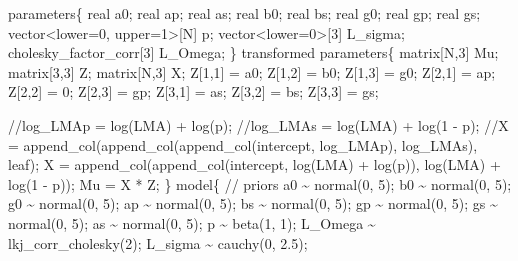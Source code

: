 \documentclass[
  12pt,
  letterpaper,
  DIV=11,
  numbers=noendperiod]{scrartcl}
\newenvironment{Shaded}{\begin{snugshade}}{\end{snugshade}}
\newcommand{\CommentTok}[1]{\textcolor[rgb]{0.37,0.37,0.37}{#1}}
\newcommand{\DataTypeTok}[1]{\textcolor[rgb]{0.68,0.00,0.00}{#1}}
\newcommand{\DecValTok}[1]{\textcolor[rgb]{0.68,0.00,0.00}{#1}}
\newcommand{\FloatTok}[1]{\textcolor[rgb]{0.68,0.00,0.00}{#1}}
\newcommand{\KeywordTok}[1]{\textcolor[rgb]{0.00,0.23,0.31}{#1}}
\newcommand{\NormalTok}[1]{\textcolor[rgb]{0.00,0.23,0.31}{#1}}
\begin{document}
\begin{Shaded}
\begin{Highlighting}[]
\KeywordTok{parameters}\NormalTok{\{}
  \DataTypeTok{real}\NormalTok{ a0;}
  \DataTypeTok{real}\NormalTok{ ap;}
  \DataTypeTok{real}\NormalTok{ as;}
  \DataTypeTok{real}\NormalTok{ b0;}
  \DataTypeTok{real}\NormalTok{ bs;}
  \DataTypeTok{real}\NormalTok{ g0;}
  \DataTypeTok{real}\NormalTok{ gp;}
  \DataTypeTok{real}\NormalTok{ gs;}
  \DataTypeTok{vector}\NormalTok{\textless{}}\KeywordTok{lower}\NormalTok{=}\DecValTok{0}\NormalTok{, }\KeywordTok{upper}\NormalTok{=}\DecValTok{1}\NormalTok{\textgreater{}[N] p;}
  \DataTypeTok{vector}\NormalTok{\textless{}}\KeywordTok{lower}\NormalTok{=}\DecValTok{0}\NormalTok{\textgreater{}[}\DecValTok{3}\NormalTok{] L\_sigma;}
  \DataTypeTok{cholesky\_factor\_corr}\NormalTok{[}\DecValTok{3}\NormalTok{] L\_Omega;}
\NormalTok{\}}
\KeywordTok{transformed parameters}\NormalTok{\{}
  \DataTypeTok{matrix}\NormalTok{[N,}\DecValTok{3}\NormalTok{] Mu;}
  \DataTypeTok{matrix}\NormalTok{[}\DecValTok{3}\NormalTok{,}\DecValTok{3}\NormalTok{] Z;}
  \DataTypeTok{matrix}\NormalTok{[N,}\DecValTok{3}\NormalTok{] X;}
\NormalTok{  Z[}\DecValTok{1}\NormalTok{,}\DecValTok{1}\NormalTok{] = a0;}
\NormalTok{  Z[}\DecValTok{1}\NormalTok{,}\DecValTok{2}\NormalTok{] = b0;}
\NormalTok{  Z[}\DecValTok{1}\NormalTok{,}\DecValTok{3}\NormalTok{] = g0;}
\NormalTok{  Z[}\DecValTok{2}\NormalTok{,}\DecValTok{1}\NormalTok{] = ap;}
\NormalTok{  Z[}\DecValTok{2}\NormalTok{,}\DecValTok{2}\NormalTok{] = }\DecValTok{0}\NormalTok{;}
\NormalTok{  Z[}\DecValTok{2}\NormalTok{,}\DecValTok{3}\NormalTok{] = gp;}
\NormalTok{  Z[}\DecValTok{3}\NormalTok{,}\DecValTok{1}\NormalTok{] = as;}
\NormalTok{  Z[}\DecValTok{3}\NormalTok{,}\DecValTok{2}\NormalTok{] = bs;}
\NormalTok{  Z[}\DecValTok{3}\NormalTok{,}\DecValTok{3}\NormalTok{] = gs;}

  \CommentTok{//log\_LMAp = log(LMA) + log(p);}
  \CommentTok{//log\_LMAs = log(LMA) + log(1 {-} p);}
  \CommentTok{//X = append\_col(append\_col(append\_col(intercept, log\_LMAp), log\_LMAs), leaf);}
\NormalTok{  X = append\_col(append\_col(intercept, log(LMA) + log(p)), log(LMA) + log(}\DecValTok{1}\NormalTok{ {-} p));}
\NormalTok{  Mu = X * Z;}
\NormalTok{\}}
\KeywordTok{model}\NormalTok{\{}
  \CommentTok{// priors}
\NormalTok{  a0 \textasciitilde{} normal(}\DecValTok{0}\NormalTok{, }\DecValTok{5}\NormalTok{);}
\NormalTok{  b0 \textasciitilde{} normal(}\DecValTok{0}\NormalTok{, }\DecValTok{5}\NormalTok{);}
\NormalTok{  g0 \textasciitilde{} normal(}\DecValTok{0}\NormalTok{, }\DecValTok{5}\NormalTok{);}
\NormalTok{  ap \textasciitilde{} normal(}\DecValTok{0}\NormalTok{, }\DecValTok{5}\NormalTok{);}
\NormalTok{  bs \textasciitilde{} normal(}\DecValTok{0}\NormalTok{, }\DecValTok{5}\NormalTok{);}
\NormalTok{  gp \textasciitilde{} normal(}\DecValTok{0}\NormalTok{, }\DecValTok{5}\NormalTok{);}
\NormalTok{  gs \textasciitilde{} normal(}\DecValTok{0}\NormalTok{, }\DecValTok{5}\NormalTok{);}
\NormalTok{  as \textasciitilde{} normal(}\DecValTok{0}\NormalTok{, }\DecValTok{5}\NormalTok{);}
\NormalTok{  p \textasciitilde{} beta(}\DecValTok{1}\NormalTok{, }\DecValTok{1}\NormalTok{);}
\NormalTok{  L\_Omega \textasciitilde{} lkj\_corr\_cholesky(}\DecValTok{2}\NormalTok{);}
\NormalTok{  L\_sigma \textasciitilde{} cauchy(}\DecValTok{0}\NormalTok{, }\FloatTok{2.5}\NormalTok{);}


\end{Highlighting}
\end{Shaded}
\end{document}
